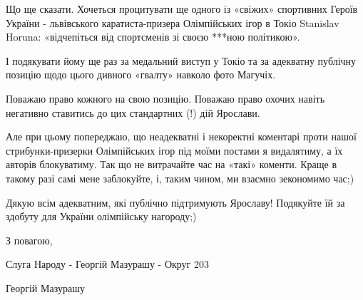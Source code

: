 Що ще сказати. Хочеться процитувати ще одного із «свіжих» спортивних Героїв
України - львівського каратиста-призера Олімпійських ігор в Токіо Stanislav
Horuna: «відчепіться від спортсменів зі своєю ***ною політикою». 

І подякувати йому ще раз за медальний виступ у Токіо та за адекватну публічну
позицію щодо цього дивного «гвалту» навколо фото Магучіх.

Поважаю право кожного на свою позицію. Поважаю право охочих навіть негативно
ставитись до цих стандартних (!) дій Ярослави.

Але при цьому попереджаю, що неадекватні і некоректні коментарі проти нашої
стрибунки-призерки Олімпійських ігор під моїми постами я видалятиму, а їх
авторів блокуватиму. Так що не витрачайте час на «такі» коменти. Краще в такому
разі самі мене заблокуйте, і, таким чином, ми взаємно зекономимо час;)

Дякую всім адекватним, які публічно підтримують Ярославу! Подякуйте їй за
здобуту для України олімпійську нагороду;)

З повагою,

Слуга Народу - Георгій Мазурашу - Округ 203

Георгій Мазурашу
